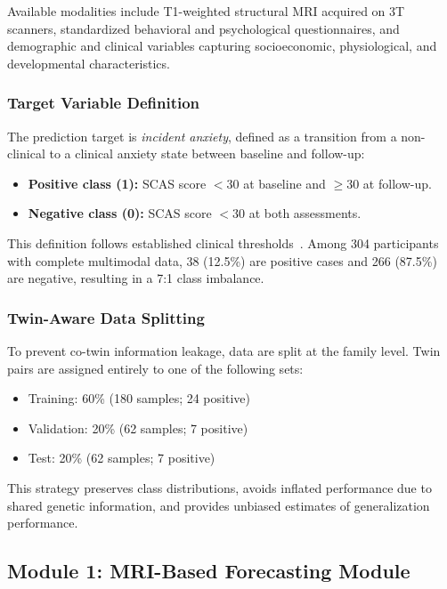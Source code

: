 \documentclass[10pt,letterpaper]{article}
\begin{document}
Available modalities include T1-weighted structural MRI acquired on 3T scanners, standardized behavioral and psychological questionnaires, and demographic and clinical variables capturing socioeconomic, physiological, and developmental characteristics.

\subsubsection*{\textbf{Target Variable Definition}}

The prediction target is \emph{incident anxiety}, defined as a transition from a non-clinical to a clinical anxiety state between baseline and follow-up:
\begin{itemize}
    \item \textbf{Positive class (1):} SCAS score $<30$ at baseline and $\geq30$ at follow-up.
    \item \textbf{Negative class (0):} SCAS score $<30$ at both assessments.
\end{itemize}

This definition follows established clinical thresholds~\cite{ref35}. Among 304 participants with complete multimodal data, 38 (12.5\%) are positive cases and 266 (87.5\%) are negative, resulting in a 7:1 class imbalance.

\subsubsection*{\textbf{Twin-Aware Data Splitting}}

To prevent co-twin information leakage, data are split at the family level. Twin pairs are assigned entirely to one of the following sets:
\begin{itemize}
    \item Training: 60\% (180 samples; 24 positive)
    \item Validation: 20\% (62 samples; 7 positive)
    \item Test: 20\% (62 samples; 7 positive)
\end{itemize}

This strategy preserves class distributions, avoids inflated performance due to shared genetic information, and provides unbiased estimates of generalization performance.

\subsection*{Module 1: MRI-Based Forecasting Module}
\end{document}
